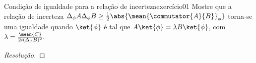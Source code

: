 \begin{exercício}{Condição de igualdade para a relação de incerteza}{exercício01}
    Mostre que a relação de incerteza \(\Delta_\phi A \Delta_\phi B \geq \frac12\abs{\mean{\commutator{A}{B}}_\phi}\) torna-se uma igualdade quando \(\ket{\phi}\) é tal que \(A\ket{\phi} = \lambda B \ket{\phi}\), com \(\lambda = \frac{\mean{C}}{2i (\Delta_\phi B)^2}.\)
\end{exercício}
\begin{proof}[Resolução]
    
\end{proof}
